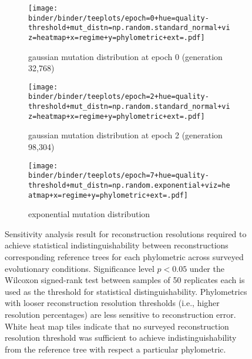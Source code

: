 \begin{figure*}
  \centering
  \begin{subfigure}[b]{\textwidth}
    \centering
    \texttt{[image: binder/binder/teeplots/epoch=0+hue=quality-threshold+mut\_distn=np.random.standard\_normal+viz=heatmap+x=regime+y=phylometric+ext=.pdf]}
    \caption{%
      gaussian mutation distribution at epoch 0 (generation 32,768)}
    \label{fig:reconstructed-tree-phylometrics-error-sensitivity-analysis:epoch0}
  \end{subfigure}
  \begin{subfigure}[b]{\textwidth}
    \centering
    \texttt{[image: binder/binder/teeplots/epoch=2+hue=quality-threshold+mut\_distn=np.random.standard\_normal+viz=heatmap+x=regime+y=phylometric+ext=.pdf]}
    \caption{%
      gaussian mutation distribution at epoch 2 (generation 98,304)}
    \label{fig:reconstructed-tree-phylometrics-error-sensitivity-analysis:epoch2}
  \end{subfigure}
  \begin{subfigure}[b]{\textwidth}
    \centering
    \texttt{[image: binder/binder/teeplots/epoch=7+hue=quality-threshold+mut\_distn=np.random.exponential+viz=heatmap+x=regime+y=phylometric+ext=.pdf]}
    \caption{%
      exponential mutation distribution}
    \label{fig:reconstructed-tree-phylometrics-error-sensitivity-analysis:exponential}
  \end{subfigure}
  \caption{%
    Sensitivity analysis result for reconstruction resolutions required to achieve statistical indistinguishability between reconstructions corresponding reference trees for each phylometric across surveyed evolutionary conditions.
    Significance level $p<0.05$ under the Wilcoxon signed-rank test between samples of 50 replicates each is used as the threshold for statistical distinguishability.
    Phylometrics with looser reconstruction resolution thresholds (i.e., higher resolution percentages) are less sensitive to reconstruction error.
    White heat map tiles indicate that no surveyed reconstruction resolution threshold was sufficient to achieve indistinguishability from the reference tree with respect a particular phylometric.
  }
  \label{fig:reconstructed-tree-phylometrics-error-sensitivity-analysis}
\end{figure*}
